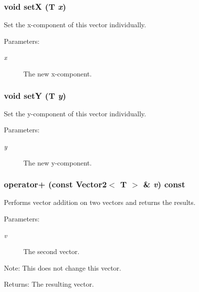\subsubsection{\setlength{\rightskip}{0pt plus 5cm}void setX (T {\em x})\hspace{0.3cm}{\tt  [inline]}}\label{classEngine_1_1Vector2_9f0ad849d5c9da2a93d0d3078f5402a3}


Set the x-component of this vector individually. \begin{Desc}
\item[Parameters:]
\begin{description}
\item[{\em x}]The new x-component. \end{description}
\end{Desc}
\subsubsection{\setlength{\rightskip}{0pt plus 5cm}void setY (T {\em y})\hspace{0.3cm}{\tt  [inline]}}\label{classEngine_1_1Vector2_473db657fd4507f12cd2638c9b9b7263}


Set the y-component of this vector individually. \begin{Desc}
\item[Parameters:]
\begin{description}
\item[{\em y}]The new y-component. \end{description}
\end{Desc}
\subsubsection{ operator+ (const {\bf Vector2}$<$ T $>$ \& {\em v}) const\hspace{0.3cm}{\tt  [inline]}}\label{classEngine_1_1Vector2_cceb2fffa22e88e87d986af3837348a0}


Performs vector addition on two vectors and returns the results. \begin{Desc}
\item[Parameters:]
\begin{description}
\item[{\em v}]The second vector. \end{description}
\end{Desc}
\begin{Desc}
\item[Note:]This does not change this vector. \end{Desc}
\begin{Desc}
\item[Returns:]The resulting vector. \end{Desc}
